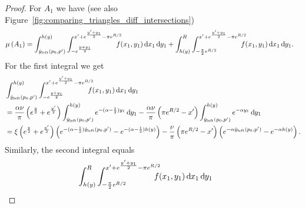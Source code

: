 \begin{proof}
For $A_1$ we have (see also Figure~\ref{fig:comparing_triangles_diff_intersections})
\begin{align*}
	\Mu{A_1} &= \int_{\hat{y}_{\text{left}}(p_0,p^\prime)}^{h(y)} 
		\int_{- e^{\frac{y + y_1}{2}}}^{x^\prime + e^{\frac{y^\prime+y_1}{2}} - \pi e^{R/2}} \hspace{-10pt} 
		f(x_1,y_1) \dd x_1 \dd y_1
		+ \int_{h(y)}^{R} \int_{-\frac{\pi}{2}e^{R/2}}^{x^\prime + e^{\frac{y^\prime+y_1}{2}} - \pi e^{R/2}} 
		\hspace{-10pt}  f(x_1,y_1) \dd x_1 \dd y_1.
\end{align*}
For the first integral we get
\begin{align*}
	&\int_{\hat{y}_{\text{left}}(p_0,p^\prime)}^{h(y)} 
		\int_{- e^{\frac{y + y_1}{2}}}^{x^\prime + e^{\frac{y^\prime+y_1}{2}} - \pi e^{R/2}} \hspace{-10pt} 
		f(x_1,y_1) \dd x_1 \dd y_1\\
	&= \frac{\alpha \nu}{\pi}\left(e^{\frac{y}{2}} + e^{\frac{y^\prime}{2}}\right) 	
		\int_{\hat{y}_{\text{left}}(p_0,p^\prime)}^{h(y)} e^{-(\alpha - \frac{1}{2})y_1} \dd y_1
		- \frac{\alpha \nu}{\pi}\left(\pi e^{R/2} - x^\prime \right) 
		\int_{\hat{y}_{\text{left}}(p_0,p^\prime)}^{h(y)} e^{-\alpha y_1} \dd y_1\\
	&= \xi \left(e^{\frac{y}{2}} + e^{\frac{y^\prime}{2}}\right)
		\left(e^{-(\alpha - \frac{1}{2})\hat{y}_{\text{left}}(p_0,p^\prime)}
		- e^{-(\alpha - \frac{1}{2})h(y)}\right)
		- \frac{\nu}{\pi} \left(\pi e^{R/2} - x^\prime\right)
		\left(e^{-\alpha\hat{y}_{\text{left}}(p_0,p^\prime)}
		- e^{-\alpha h(y)}\right).
\end{align*}
Similarly, the second integral equals
\begin{align*}
	&\hspace{-20pt}\int_{h(y)}^{R} \int_{-\frac{\pi}{2}e^{R/2}}^{x^\prime + e^{\frac{y^\prime+y_1}{2}} - \pi e^{R/2}} 
		\hspace{-10pt}  f(x_1,y_1) \dd x_1 \dd y_1\\

\end{align*}
\end{proof}
